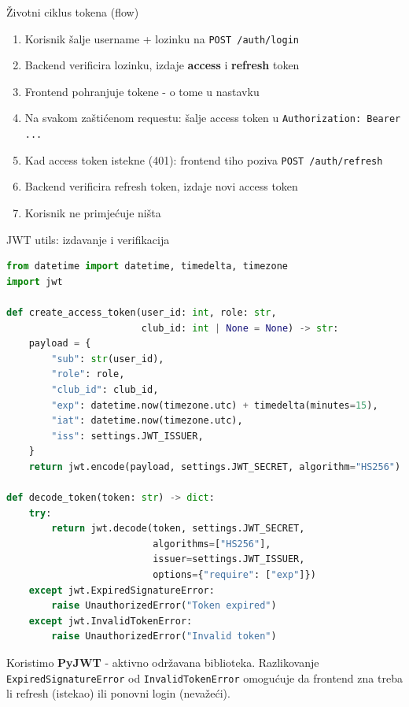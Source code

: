 \begin{frame}{Životni ciklus tokena (flow)}
	\begin{enumerate}
		\item Korisnik šalje username + lozinku na \texttt{POST /auth/login}
		\item Backend verificira lozinku, izdaje \textbf{access} i \textbf{refresh} token
		\item Frontend pohranjuje tokene - o tome u nastavku
		\item Na svakom zaštićenom requestu: šalje access token u \texttt{Authorization: Bearer ...}
		\item Kad access token istekne (401): frontend tiho poziva \texttt{POST /auth/refresh}
		\item Backend verificira refresh token, izdaje novi access token
		\item Korisnik ne primjećuje ništa
	\end{enumerate}
\end{frame}

\begin{frame}[fragile, shrink=15]{JWT utils: izdavanje i verifikacija}
\begin{lstlisting}[language=python]
from datetime import datetime, timedelta, timezone
import jwt

def create_access_token(user_id: int, role: str,
                        club_id: int | None = None) -> str:
    payload = {
        "sub": str(user_id),
        "role": role,
        "club_id": club_id,
        "exp": datetime.now(timezone.utc) + timedelta(minutes=15),
        "iat": datetime.now(timezone.utc),
        "iss": settings.JWT_ISSUER,
    }
    return jwt.encode(payload, settings.JWT_SECRET, algorithm="HS256")

def decode_token(token: str) -> dict:
    try:
        return jwt.decode(token, settings.JWT_SECRET,
                          algorithms=["HS256"],
                          issuer=settings.JWT_ISSUER,
                          options={"require": ["exp"]})
    except jwt.ExpiredSignatureError:
        raise UnauthorizedError("Token expired")
    except jwt.InvalidTokenError:
        raise UnauthorizedError("Invalid token")
\end{lstlisting}

	\vspace{0.4em}
	Koristimo \textbf{PyJWT} - aktivno održavana biblioteka. Razlikovanje \texttt{ExpiredSignatureError} od \texttt{InvalidTokenError} omogućuje da frontend zna treba li refresh (istekao) ili ponovni login (nevažeći).
\end{frame}

